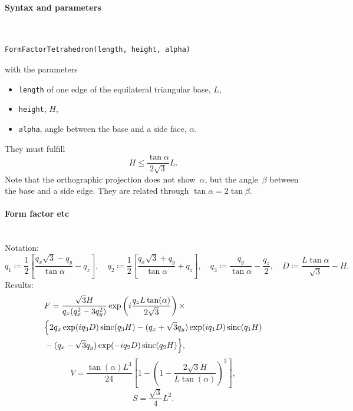 \paragraph{Syntax and parameters}\strut\\[-2ex plus .2ex minus .2ex]
\begin{lstlisting}[language=python, style=eclipseboxed,numbers=none,nolol]
  FormFactorTetrahedron(length, height, alpha)
\end{lstlisting}
with the parameters
\begin{itemize}
\item \texttt{length} of one edge of the equilateral triangular base, $L$,
\item \texttt{height}, $H$,
\item \texttt{alpha}, angle between the base and a side face, $\alpha$.
\end{itemize}
They must fulfill
\begin{displaymath}
  H\le \frac{\tan{\alpha}}{2\sqrt{3}} L.
\end{displaymath}
Note that the orthographic projection does not show~$\alpha$,
but the angle~$\beta$ between the base and a side edge.
They are related through $\tan \alpha = 2 \tan \beta$. 


\paragraph{Form factor etc}\strut\\
Notation:
\begin{equation*}
q_1  \coloneqq \frac{1}{2}\left[\frac{q_x\sqrt{3} -q_y}{\tan \alpha}-q_z \right],
\quad q_2 \coloneqq \frac{1}{2}\left[\frac{q_x\sqrt{3} +q_y}{\tan \alpha}+q_z
\right], \quad 
q_3 \coloneqq \frac{q_y}{\tan \alpha} -\frac{q_z}{2}, \quad 
D \coloneqq \frac{L \tan \alpha}{\sqrt{3}} -H.
\end{equation*}
Results:
\begin{align*}
&F=\frac{\sqrt{3}H}{q_x (q_x^2-3q_y^2)}
\exp\left(i\frac{q_z L\tan (\alpha)}{2\sqrt{3}}\right) \times \\
&\Big\{2q_x \exp(iq_3 D)\operatorname{sinc}(q_3 H) - (q_x +\sqrt{3}q_y)
\exp(iq_1 D)\operatorname{sinc}(q_1 H)\\
&-(q_x-\sqrt{3}q_y)\exp(-iq_2 D)\operatorname{sinc}(q_2 H) \Big\}, 
\end{align*}
\begin{equation*}
  V= \dfrac{\tan(\alpha) L^3}{24} \left[1- \left(1 -
  \dfrac{2\sqrt{3} H}{L \tan(\alpha)} \right)^3\right],
\end{equation*}
\begin{equation*}
  S =\dfrac{\sqrt{3}}{4}L^2.
\end{equation*}


